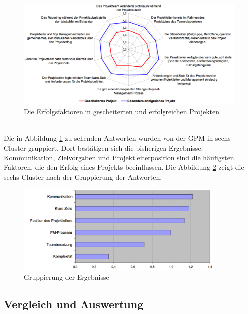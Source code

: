 \documentclass[12pt]{scrartcl}
\begin{document}
\begin{figure}[H]
	\begin{center}
		\includegraphics[width=1.1\textwidth]{img/ergebnis_erfolgsfaktoren}
		\caption{Die Erfolgsfaktoren in gescheiterten und erfolgreichen Projekten}
		\label{ergebnis_gpm_erfolgsfaktoren}	
	\end{center}
\end{figure}
\ \\
Die in Abbildung \ref{ergebnis_gpm_erfolgsfaktoren} zu sehenden Antworten wurden von der GPM in sechs Cluster gruppiert. Dort bestätigen sich die bisherigen Ergebnisse. Kommunikation, Zielvorgaben und Projektleiterposition sind die häufigsten Faktoren, die  den Erfolg eines Projekts beeinflussen. Die Abbildung \ref{ergebnis_gpm_gruppiert} zeigt die sechs Cluster nach der Gruppierung der Antworten. 

\begin{figure}[H]
	\begin{center}
		\includegraphics[width=0.9\textwidth]{img/ergebnis_gpm_gruppiert}
		\caption{Gruppierung der Ergebnisse}
		\label{ergebnis_gpm_gruppiert}	
	\end{center}
\end{figure}


\subsection{Vergleich und Auswertung}
\end{document}
